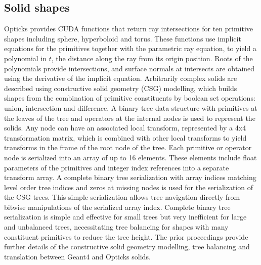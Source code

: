 \documentclass{webofc}
\begin{document}
\subsection{Solid shapes}%
%
Opticks provides CUDA functions that return ray intersections for ten primitive shapes including sphere, hyperboloid and torus.
These functions use implicit equations for the primitives together with 
the parametric ray equation, to yield a polynomial in $t$, the distance along the ray from its origin position. 
Roots of the polynomials provide intersections, and surface normals at intersects are obtained
using the derivative of the implicit equation.
%
Arbitrarily complex solids are described using constructive solid geometry (CSG) modelling, 
which builds shapes from the combination of primitive constituents by boolean set operations: union, intersection and difference.
A binary tree data structure with primitives at the leaves of the tree and operators at the internal nodes is used
to represent the solids. Any node can have an associated local transform, represented by a 4x4 transformation matrix, which 
is combined with other local transforms to yield transforms in the frame of the root node of the tree.
%
Each primitive or operator node is serialized into an array of up to 16 elements. 
These elements include float parameters of the primitives and integer index references 
into a separate transform array. 
A complete binary tree serialization with array indices matching level order tree indices
and zeros at missing nodes is used for the serialization of the CSG trees. This simple 
serialization allows tree navigation directly from bitwise manipulations of the serialized array index.
%
Complete binary tree serialization is simple and effective for small trees but very inefficient 
for large and unbalanced trees, necessitating tree balancing for shapes with many constituent primitives 
to reduce the tree height. 
The prior proceedings\cite{chep2018} provide further details of the constructive solid geometry modelling, 
tree balancing and translation between Geant4 and Opticks solids.

%
%
%
\end{document}
